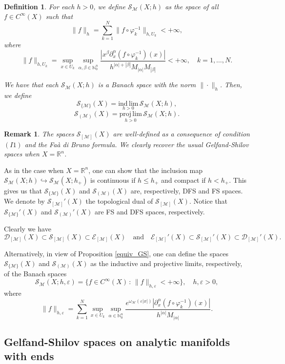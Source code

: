 \documentclass[11pt,reqno]{amsart}
\numberwithin{equation}{section}
\newtheorem{definition}[theorem]{Definition}
\newtheorem{remark}[theorem]{Remark}
\newcommand{\R}{{\mathbb{R}}} %
\newcommand{\N}{{\mathbb{N}}} %
\newcommand{\caS}{{\mathcal{S}}}
\newcommand{\M}{{\mathcal{M}}} %
\begin{document}
\begin{definition}
	For each $h>0$, we define $\caS_{\M}(X;h)$ as the space of all $f\in C^\infty(X)$ such that
	\[\|f\|_{h}=\sum_{k=1}^N\|f\circ\varphi_k^{-1}\|_{h,U_k}<+\infty,\]
	where
	\begin{equation}\label{gelf_manif}
		\|f\|_{h,U_k} = \sup_{x\in U_k}\sup_{\alpha,\beta\in\mathbb{N}_0^n} 
		\frac{|x^\beta\partial_x^\alpha (f\circ\varphi_k^{-1})(x)|}{h^{|\alpha|+|\beta|}M_{|\alpha|}M_{|\beta|}} < +\infty,\quad k=1,\dots,N.
	\end{equation}
	
	We have that each $\caS_{\M}(X;h)$ is a Banach space with the norm $\|\cdot \|_{h}$. Then, we define
	\[\caS_{\{\M\}}(X) = \underset{h>0}{\mathrm{ind\,lim}}\, \caS_{\M}(X;h),\]
	\[\caS_{(\M)}(X) = \underset{h>0}{\mathrm{proj\,lim}}\, \caS_{\M}(X;h).\]
\end{definition}

\begin{remark}
	The spaces $\caS_{[\M]}(X)$ are well-defined as a consequence of condition $(I1)$ and the Fa\`a di Bruno formula. We clearly recover the usual Gelfand-Shilov spaces when $X=\R^n$.
\end{remark}

As in the case when $X=\R^n$, one can show that the inclusion map $\caS_{\M}(X;h)\hookrightarrow \caS_{\M}(X;h_+)$ is continuous if $h\leq h_+$ and compact if $h<h_+$. This gives us that $\caS_{\{\M\}}(X)$ and $\caS_{(\M)}(X)$ are, respectively, DFS and FS spaces. We denote by $\caS_{[\M]}'(X)$ the topological dual of $\caS_{[\M]}(X)$. Notice that $\caS_{\{\M\}}'(X)$ and $\caS_{(\M)}'(X)$ are FS and DFS spaces, respectively.

Clearly we have
%
\[\mathcal{D}_{[\M]}(X)\subset \mathcal{S}_{[\M]}(X)\subset \mathcal{E}_{[\M]}(X)\quad\text{and}\quad \mathcal{E}_{[\M]}'(X)\subset \mathcal{S}_{[\M]}'(X)\subset\mathcal{D}_{[\M]}'(X).\]

Alternatively, in view of Proposition \ref{equiv_GS}, one can define the spaces $\caS_{\{\M\}}(X)$ and $\caS_{(\M)}(X)$ as the inductive and projective limits, respectively, of the Banach spaces
%
\[\caS_{\M}(X;h,\varepsilon) = \{f\in C^\infty(X)\,:\, \|f\|_{h,\varepsilon}<+\infty\},\quad h,\varepsilon>0,\]
%
where
%
\[\|f\|_{h,\varepsilon} = \sum_{k=1}^N\sup_{x\in U_k}\sup_{\alpha\in\N_0^n}\frac{e^{\omega_{\M}(\varepsilon|x|)}|\partial_x^\alpha (f\circ\varphi_k^{-1})(x)|}{h^{|\alpha|}M_{|\alpha|}}.\]

\subsection{Gelfand-Shilov spaces on analytic manifolds with ends}
\end{document}
